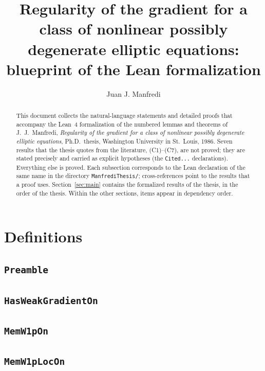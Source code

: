 \documentclass[11pt]{amsart}
\title[Blueprint of the Lean formalization]{Regularity of the gradient for a class of nonlinear possibly degenerate elliptic equations: blueprint of the Lean formalization}
\author{Juan J. Manfredi}
\theoremstyle{definition}
\begin{document}
\begin{abstract}
This document collects the natural-language statements and detailed proofs that accompany the Lean~4 formalization of the numbered lemmas and theorems of J.~J.~Manfredi, \emph{Regularity of the gradient for a class of nonlinear possibly degenerate elliptic equations}, Ph.D.\ thesis, Washington University in St.~Louis, 1986.
Seven results that the thesis quotes from the literature, (C1)--(C7), are not proved; they are stated precisely and carried as explicit hypotheses (the \texttt{Cited...} declarations). Everything else is proved.
Each subsection corresponds to the Lean declaration of the same name in the directory \texttt{ManfrediThesis/}; cross-references point to the results that a proof uses.
Section~\ref{sec:main} contains the formalized results of the thesis, in the order of the thesis.
Within the other sections, items appear in dependency order.
\end{abstract}
\maketitle
\tableofcontents

\section{Definitions}
\subsection{\texorpdfstring{\texttt{Preamble}}{Preamble}}\label{node:Preamble}


\subsection{\texorpdfstring{\texttt{HasWeakGradientOn}}{HasWeakGradientOn}}\label{node:HasWeakGradientOn}


\subsection{\texorpdfstring{\texttt{MemW1pOn}}{MemW1pOn}}\label{node:MemW1pOn}


\subsection{\texorpdfstring{\texttt{MemW1pLocOn}}{MemW1pLocOn}}\label{node:MemW1pLocOn}

\end{document}
